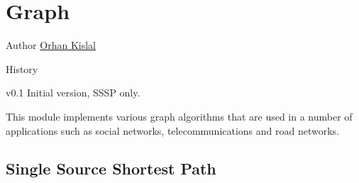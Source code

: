 



\chapter[Graph]{Graph}

\begin{moduleinfo}
\item[Author] \href{mailto:okislal@pivotal.io}{Orhan Kislal}
\item[History]
	\begin{modulehistory}
		\item[v0.1] Initial version, SSSP only.
	\end{modulehistory}
\end{moduleinfo}



This module implements various graph algorithms that are used in a number of applications such as social networks, telecommunications and road networks.



\section{Single Source Shortest Path} \label{sec:graph:sssp}

